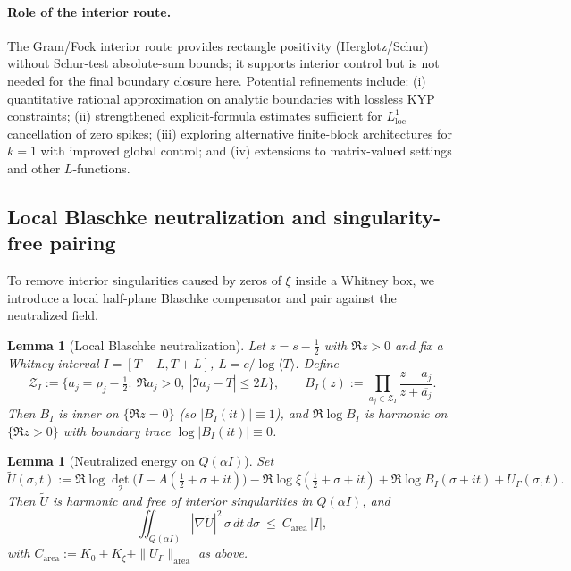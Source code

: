\documentclass[11pt]{article}
\newtheorem{lemma}[theorem]{Lemma}
\theoremstyle{definition}
\theoremstyle{remark}
\begin{document}
\paragraph{Role of the interior route.}
The Gram/Fock interior route provides rectangle positivity (Herglotz/Schur) without Schur-test absolute-sum bounds; it supports interior control but is not needed for the final boundary closure here.
Potential refinements include: (i) quantitative rational approximation on analytic boundaries with lossless KYP constraints; (ii) strengthened explicit-formula estimates sufficient for $L^1_{\mathrm{loc}}$ cancellation of zero spikes; (iii) exploring alternative finite-block architectures for $k=1$ with improved global control; and (iv) extensions to matrix-valued settings and other $L$-functions.

\subsection*{Local Blaschke neutralization and singularity-free pairing}
To remove interior singularities caused by zeros of $\xi$ inside a Whitney box, we introduce a local half-plane Blaschke compensator and pair against the neutralized field.

\begin{lemma}[Local Blaschke neutralization]\label{lem:local-blaschke}
Let $z=s-\tfrac12$ with $\Re z>0$ and fix a Whitney interval $I=[T-L,T+L]$, $L=c/\log\langle T\rangle$. Define
\[ \mathcal Z_I:=\{a_j=\rho_j-\tfrac12:\ \Re a_j>0,\ |\Im a_j-T|\le 2L\},\qquad B_I(z):=\prod_{a_j\in\mathcal Z_I}\frac{z-a_j}{z+\overline{a_j}}. \]
Then $B_I$ is inner on $\{\Re z=0\}$ (so $|B_I(it)|\equiv 1$), and $\Re\log B_I$ is harmonic on $\{\Re z>0\}$ with boundary trace $\log|B_I(it)|\equiv 0$.
\end{lemma}

\begin{lemma}[Neutralized energy on $Q(\alpha I)$]\label{lem:neutralized-energy}
Set
\[ \widetilde U(\sigma,t):=\Re\log\det_2\!\big(I-A(\tfrac12+\sigma+it)\big)-\Re\log\xi\!\left(\tfrac12+\sigma+it\right)+\Re\log B_I(\sigma+it)+U_\Gamma(\sigma,t). \]
Then $\widetilde U$ is harmonic and free of interior singularities in $Q(\alpha I)$, and
\[ \iint_{Q(\alpha I)} |\nabla \widetilde U|^2\,\sigma\,dt\,d\sigma\ \le\ C_{\mathrm{area}}\,|I|, \]
with $C_{\mathrm{area}}:=K_0+K_\xi+\|U_\Gamma\|_{\mathrm{area}}$ as above.
\end{lemma}
\end{document}
